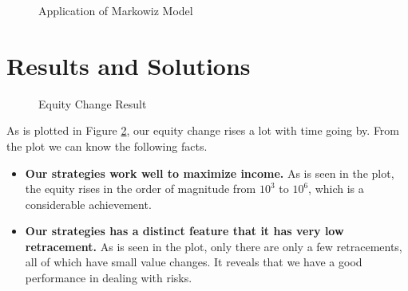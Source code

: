 \documentclass[12pt,a4paper]{article}
\begin{document}
\begin{spacing}{1.2}
\begin{figure}[H]
	\caption{Application of Markowiz Model}
	\label{figure:markowiz}
\end{figure}



\section{Results and Solutions}
\label{Results_Solutions}

\begin{figure}[H]
	\caption{Equity Change Result}
	\label{figure:equity_change}
\end{figure}

As is plotted in Figure \ref{figure:equity_change}, our equity change rises a lot with time going by. From the plot we can know the following facts.

\begin{itemize}
	\item \textbf{Our strategies work well to maximize income.} As is seen in the plot, the equity rises in the order of magnitude from $10^3$ to $10^6$, which is a considerable achievement.
	
	\item \textbf{Our strategies has a distinct feature that it has very low retracement.} As is seen in the plot, only there are only a few retracements, all of which have small value changes. It reveals that we have a good performance in dealing with risks.
\end{itemize}


\end{spacing}
\end{document}
